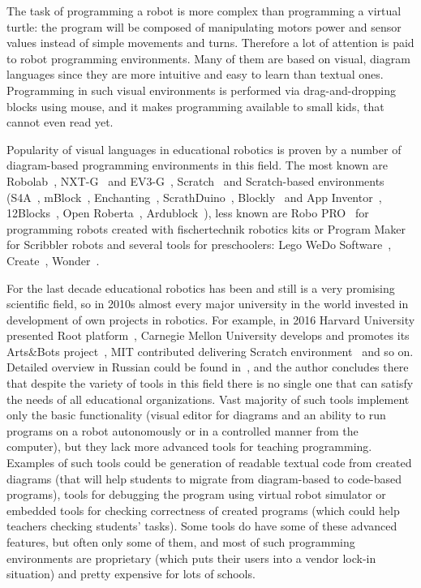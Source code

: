 \documentclass[conference]{IEEEtran}
\begin{document}
The task of programming a robot is more complex than programming a virtual turtle: the program will be composed of manipulating motors power and sensor values instead of simple movements and turns. Therefore a lot of attention is paid to robot programming environments. Many of them are based on visual, diagram languages since they are more intuitive and easy to learn than textual ones. Programming in such visual environments is performed via drag-and-dropping blocks using mouse, and it makes programming available to small kids, that cannot even read yet. 

Popularity of visual languages in educational robotics is proven by a number of diagram-based programming environments in this field. The most known are Robolab~\cite{erwin2000lego}, NXT-G~\cite{kelly2010lego} and EV3-G~\cite{valk2014lego}, Scratch~\cite{resnick2009scratch} and Scratch-based environments (S4A~\cite{s4a}, mBlock~\cite{mblock}, Enchanting~\cite{enchanting}, ScrathDuino~\cite{scratchduino}, Blockly~\cite{blockly} and App Inventor~\cite{wolber2011app}, 12Blocks~\cite{12blocks}, Open Roberta~\cite{jost2014graphical}, Ardublock~\cite{ardublock}), less known are Robo PRO~\cite{chang2006incorporating} for programming robots created with fischertechnik robotics kits or Program Maker for Scribbler robots and several tools for preschoolers: Lego WeDo Software~\cite{mayerova2012pilot}, Create~\cite{cross2013visual}, Wonder~\cite{wonder}. 

For the last decade educational robotics has been and still is a very promising scientific field, so in 2010s almost every major university in the world invested in development of own projects in robotics. For example, in 2016 Harvard University presented Root platform~\cite{root}, Carnegie Mellon University develops and promotes its Arts\&Bots project~\cite{cross2013visual}, MIT contributed delivering Scratch environment~\cite{resnick2009scratch} and so on. Detailed overview in Russian could be found in~\cite{mordvinov2016NONPUBLISHED}, and the author concludes there that despite the variety of tools in this field there is no single one that can satisfy the needs of all educational organizations. Vast majority of such tools implement only the basic functionality (visual editor for diagrams and an ability to run programs on a robot autonomously or in a controlled manner from the computer), but they lack more advanced tools for teaching programming. Examples of such tools could be generation of readable textual code from created diagrams (that will help students to migrate from diagram-based to code-based programs), tools for debugging the program using virtual robot simulator or embedded tools for checking correctness of created programs (which could help teachers checking students' tasks). Some tools do have some of these advanced features, but often only some of them, and most of such programming environments are proprietary (which puts their users into a vendor lock-in situation) and pretty expensive for lots of schools.
\end{document}
